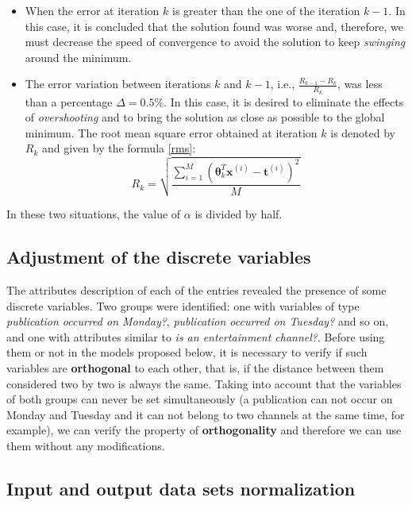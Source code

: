 \documentclass[10pt,twocolumn,letterpaper]{article}
\begin{document}
\begin{itemize}
	\item When the error at iteration \(k\) is greater than the one of the iteration \(k -1\). In this case, it is concluded that the solution found was worse and, therefore, we must decrease the speed of convergence to avoid the solution to keep \textit{swinging} around the minimum.
	\item The error variation between iterations \(k\) and \(k -1\), i.e., \(\frac{R_{k-1} - R_k}{R_k}\), was less than a percentage \(\Delta = 0.5\%\). In this case, it is desired to eliminate the effects of \textit {overshooting} and to bring the solution as close as possible to the global minimum. The root mean square error obtained at iteration \(k\) is denoted by \(R_k\) and given by the formula \ref {rms}:
	\begin {equation}
	\label{rms}
	R_k = \sqrt{\frac {\sum_{i=1}^{M} \left(\bm{\theta}_k^T\bm{x}^{(i)} - \bm{t}^{(i)}\right)^2}{M}}
	\end{equation}
\end{itemize}

In these two situations, the value of \(\alpha\) is divided by half.

\subsection {Adjustment of the discrete variables}

The attributes description of each of the entries revealed the presence of some discrete variables. Two groups were identified: one with variables of type \textit {publication occurred on Monday?}, \textit {publication occurred on Tuesday?} and so on, and one with attributes similar to \textit{is an entertainment channel?}. Before using them or not in the models proposed below, it is necessary to verify if such variables are \textbf {orthogonal} to each other, that is, if the distance between them considered two by two is always the same. Taking into account that the variables of both groups can never be set simultaneously (a publication can not occur on Monday and Tuesday and it can not belong to two channels at the same time, for example), we can verify the property of \textbf {orthogonality} and therefore we can use them without any modifications.

\subsection {Input and output data sets normalization}
\end{document}
